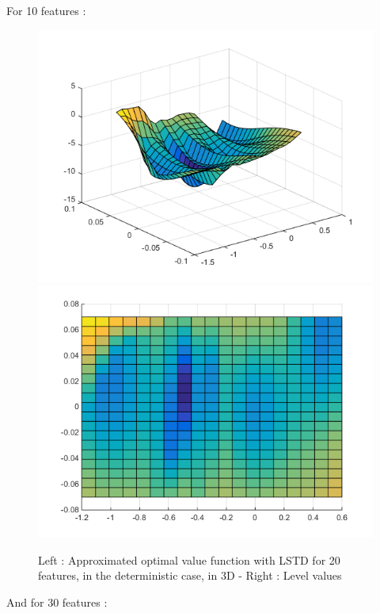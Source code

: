 \documentclass[a4paper, 12pt]{article}
\begin{document}
For 10 features :

\begin{figure}[H]
	\centering
	\noindent\includegraphics[scale=0.3]{lstd-10feat-determ.png}
	\noindent\includegraphics[scale=0.3]{lstd-10feat-determ-flat.png}
	\caption{Left : Approximated optimal value function with LSTD for 20 features, in the deterministic case, in 3D - Right : Level values}
\end{figure}

And for 30 features :
\end{document}
